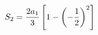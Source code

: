 \documentclass[preview]{standalone}
\begin{document}
\begin{align*}
\special{dvisvgm:raw <g id='unique000'>}S_2=\frac{2a_1}{3}\left[1-\left(-\frac{1}{2}\right)^2\right]\special{dvisvgm:raw </g>}
\end{align*}
\end{document}

